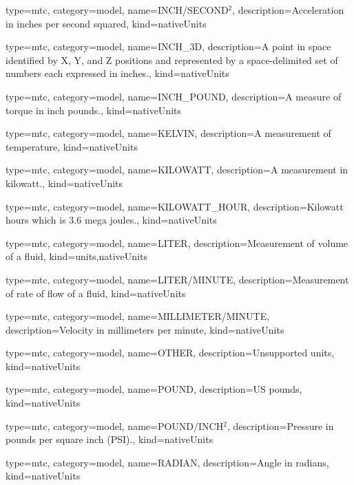 {
  type=mtc,
  category=model,
  name={INCH/SECOND$^2$},
  description={Acceleration in inches per second squared},
  kind={nativeUnits}
}


{
  type=mtc,
  category=model,
  name={INCH\_3D},
  description={A point in space identified by X, Y, and Z positions and represented by a space-delimited set of numbers each expressed in inches.},
  kind={nativeUnits}
}


{
  type=mtc,
  category=model,
  name={INCH\_POUND},
  description={A measure of torque in inch pounds.},
  kind={nativeUnits}
}


{
  type=mtc,
  category=model,
  name={KELVIN},
  description={A measurement of temperature},
  kind={nativeUnits}
}


{
  type=mtc,
  category=model,
  name={KILOWATT},
  description={A measurement in kilowatt.},
  kind={nativeUnits}
}


{
  type=mtc,
  category=model,
  name={KILOWATT\_HOUR},
  description={Kilowatt hours which is 3.6 mega joules.},
  kind={nativeUnits}
}


{
  type=mtc,
  category=model,
  name={LITER},
  description={Measurement of volume of a fluid},
  kind={units,nativeUnits}
}


{
  type=mtc,
  category=model,
  name={LITER/MINUTE},
  description={Measurement of rate of flow of a fluid},
  kind={nativeUnits}
}


{
  type=mtc,
  category=model,
  name={MILLIMETER/MINUTE},
  description={Velocity in millimeters per minute},
  kind={nativeUnits}
}


{
  type=mtc,
  category=model,
  name={OTHER},
  description={Unsupported units},
  kind={nativeUnits}
}


{
  type=mtc,
  category=model,
  name={POUND},
  description={US pounds},
  kind={nativeUnits}
}


{
  type=mtc,
  category=model,
  name={POUND/INCH$^2$},
  description={Pressure in pounds per square inch (PSI).},
  kind={nativeUnits}
}


{
  type=mtc,
  category=model,
  name={RADIAN},
  description={Angle in radians},
  kind={nativeUnits}
}


